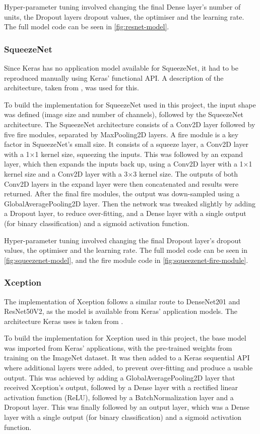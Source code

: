 Hyper-parameter tuning involved changing the final Dense layer's number of units, the Dropout layers dropout values, the optimiser and the learning rate. The full model code can be seen in \autoref{fig:resnet-model}.

\subsubsection{SqueezeNet}
Since Keras has no application model available for SqueezeNet, it had to be reproduced manually using Keras' functional API. A description of the architecture, taken from \cite{iandola2016squeezenet}, was used for this.

To build the implementation for SqueezeNet used in this project, the input shape was defined (image size and number of channels), followed by the SqueezeNet architecture. The SqueezeNet architecture consists of a Conv2D layer followed by five fire modules, separated by MaxPooling2D layers. A fire module is a key factor in SqueezeNet's small size. It consists of a squeeze layer, a Conv2D layer with a 1$\times$1 kernel size, squeezing the inputs. This was followed by an expand layer, which then expands the inputs back up, using a Conv2D layer with a 1$\times$1 kernel size and a Conv2D layer with a 3$\times$3 kernel size. The outputs of both Conv2D layers in the expand layer were then concatenated and results were returned. After the final fire modules, the output was down-sampled using a GlobalAveragePooling2D layer. Then the network was tweaked slightly by adding a Dropout layer, to reduce over-fitting, and a Dense layer with a single output (for binary classification) and a sigmoid activation function.

Hyper-parameter tuning involved changing the final Dropout layer's dropout values, the optimiser and the learning rate. The full model code can be seen in \autoref{fig:squeezenet-model}, and the fire module code in \autoref{fig:squeezenet-fire-module}.

\subsubsection{Xception}
The implementation of Xception follows a similar route to DenseNet201 and ResNet50V2, as the model is available from Keras' application models. The architecture Keras uses is taken from \cite{chollet2017xception}.

To build the implementation for Xception used in this project, the base model was imported from Keras' applications, with the pre-trained weights from training on the ImageNet dataset. It was then added to a Keras sequential API where additional layers were added, to prevent over-fitting and produce a usable output. This was achieved by adding a GlobalAveragePooling2D layer that received Xception's output, followed by a Dense layer with a rectified linear activation function (ReLU), followed by a BatchNormalization layer and a Dropout layer. This was finally followed by an output layer, which was a Dense layer with a single output (for binary classification) and a sigmoid activation function.

